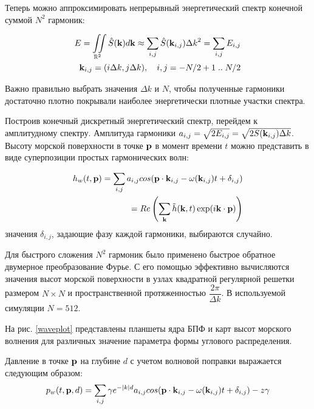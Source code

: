 Теперь можно аппроксимировать непрерывный энергетический спектр конечной суммой $N^2$ гармоник:

\begin{equation}
\begin{split}
E = \iint\limits_{\mathbb{R}^2} \hat{S}(\mathbf{k})d\mathbf{k}
    \approx \sum_{i,j} \hat{S}(\mathbf{k}_{i,j}) {\Delta k}^2 
    = \sum_{i,j} E_{i,j}\\
\mathbf{k}_{i,j} = (i\Delta k, j\Delta k), \quad i,j = -N/2+1 \; .. \; N/2 
\end{split}
\end{equation}

Важно правильно выбрать значения $\Delta k$ и $N$, чтобы полученные гармоники достаточно плотно покрывали наиболее энергетически плотные участки спектра.

Построив конечный дискретный энергетический спектр, перейдем к амплитудному спектру. Амплитуда гармоники $a_{i,j} = \sqrt{2E_{i,j}} = \sqrt{2S(\mathbf{k}_{i,j})\Delta k}$. Высоту морской поверхности в точке $\mathbf{p}$ в момент времени $t$ можно представить в виде суперпозиции простых гармонических волн:

\begin{equation}
\label{wave_height}
\begin{split}
h_w(t,\mathbf{p}) = \sum_{i,j} a_{i,j}cos(\mathbf{p}\cdot \mathbf{k}_{i,j} - \omega(\mathbf{k}_{i,j})t + \delta_{i,j}) \\
= Re\left( \sum_{\mathbf{k}} \tilde{h}(\mathbf{k}, t)
 \exp(i\mathbf{k} \cdot \mathbf{p}) \right)
\end{split}
\end{equation}
значения $\delta_{i,j}$, задающие фазу каждой гармоники, выбираются случайно.

Для быстрого сложения $N^2$ гармоник было применено быстрое обратное двумерное преобразование Фурье. С его помощью эффективно вычисляются значения высот морской поверхности в узлах квадратной регулярной решетки размером $N \times N$ и пространственной протяженностью $\dfrac{2\pi}{\Delta k}$. В используемой симуляции $N = 512$.

На рис. \ref{waveplot} представлены планшеты ядра БПФ и карт высот морского волнения для различных значение параметра формы углового распределения.

Давление в точке $\mathbf{p}$ на глубине $d$ с учетом волновой поправки выражается следующим образом:
\begin{equation}
\label{wave_height}
	p_w(t,\mathbf{p},d) = \sum_{i,j}
		\gamma e^{-\lvert k\rvert d} 
		a_{i,j}cos(\mathbf{p}\cdot \mathbf{k}_{i,j} 
		- \omega(\mathbf{k}_{i,j})t 
		+ \delta_{i,j}) - z \gamma
\end{equation}

